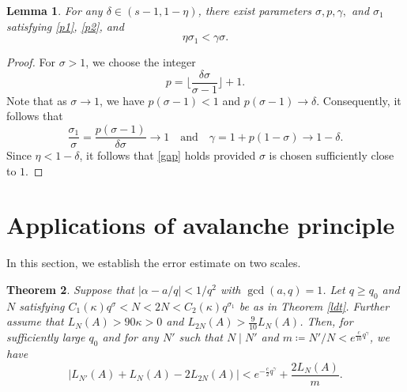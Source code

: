 \documentclass[reqno,12pt]{amsart}
\theoremstyle{plain}
\newtheorem{theorem}{Theorem}[section]
\newtheorem{lemma}[theorem]{Lemma}
\theoremstyle{definition}
\numberwithin{equation}{section}
\begin{document}
\begin{lemma}\label{paranew}
    For any $\delta \in (s-1, 1-\eta)$, there exist parameters $\sigma, p, \gamma,$ and $\sigma_{1}$ satisfying \eqref{p1}, \eqref{p2}, and
    \begin{equation}\label{gap}
        \eta \sigma_{1} < \gamma\sigma.
    \end{equation}
\end{lemma}


\begin{proof}
    For $\sigma>1$, we choose the integer
    \begin{equation*}
        p=\bigg\lfloor \frac{\delta\sigma}{\sigma-1} \bigg\rfloor+1.
    \end{equation*}
    Note that as  $\sigma \to 1$, we have $p(\sigma-1)<1$ and $p(\sigma-1)\to \delta$. Consequently, it follows that
    \begin{equation*}
        \frac{\sigma_{1}}{\sigma} = \frac{p(\sigma-1)}{\delta \sigma} \to 1 \quad \text{and} \quad \gamma = 1+p(1-\sigma) \to 1-\delta.
    \end{equation*}
    Since $\eta < 1-\delta$, it follows that \eqref{gap} holds provided $\sigma$ is chosen sufficiently close to $1$.
\end{proof}




\section{Applications of avalanche principle}
In this section, we establish the error estimate on two scales.
\begin{theorem}\label{map}
    Suppose that $|\alpha - a/q| < 1/q^{2}$ with $\gcd(a,q) = 1$. Let $q \geqslant q_{0}$ and $N$ satisfying $C_{1}(\kappa)q^{\sigma} < N <2N< C_{2}(\kappa)q^{\sigma_{1}}$ be as in Theorem \ref{ldt}. Further assume that $L_{N}(A) > 90\kappa > 0$ and $L_{2N}(A) > \frac{9}{10}L_{N}(A)$. Then, for sufficiently large $q_{0}$ and for any $N'$ such that $N \mid N'$ and $m \coloneq N'/N < e^{\frac{c}{10}q^{\gamma}}$, we have
    \begin{equation*}
        |L_{N'}(A) + L_{N}(A) - 2L_{2N}(A)| < e^{-\frac{c}{2}q^{\gamma}} + \frac{2L_{N}(A)}{m}.
    \end{equation*}
\end{theorem}
\end{document}
